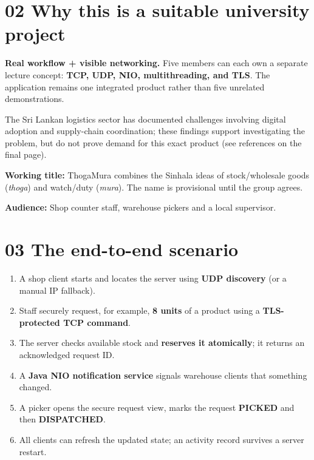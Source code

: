 \documentclass[10pt,a4paper]{article}
\newcommand{\quiet}[1]{{\color{grey}#1}}
\begin{document}
\section*{02 \quad Why this is a suitable university project}
\begin{infoBox}
\textbf{Real workflow + visible networking.} Five members can each own a separate lecture concept: \textbf{TCP, UDP, NIO, multithreading, and TLS}. The application remains one integrated product rather than five unrelated demonstrations.
\end{infoBox}
The Sri Lankan logistics sector has documented challenges involving digital adoption and supply-chain coordination; these findings support investigating the problem, but do not prove demand for this exact product (see references on the final page).

\vfill
\quiet{\textbf{Working title:} ThogaMura combines the Sinhala ideas of stock/wholesale goods (\emph{thoga}) and watch/duty (\emph{mura}). The name is provisional until the group agrees.}\par
\quiet{\textbf{Audience:} Shop counter staff, warehouse pickers and a local supervisor.}\par

\newpage

\section*{03 \quad The end-to-end scenario}
\begin{enumerate}
\item A shop client starts and locates the server using \textbf{UDP discovery} (or a manual IP fallback).
\item Staff securely request, for example, \textbf{8 units} of a product using a \textbf{TLS-protected TCP command}.
\item The server checks available stock and \textbf{reserves it atomically}; it returns an acknowledged request ID.
\item A \textbf{Java NIO notification service} signals warehouse clients that something changed.
\item A picker opens the secure request view, marks the request \textbf{PICKED} and then \textbf{DISPATCHED}.
\item All clients can refresh the updated state; an activity record survives a server restart.
\end{enumerate}
\end{document}
